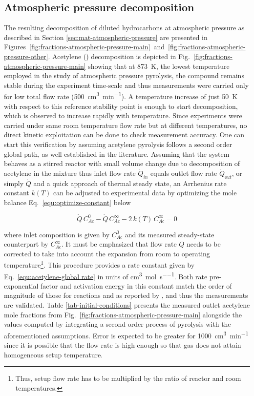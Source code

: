 \documentclass[final,3p,times,twocolumn,sort&compress]{elsarticle}
\newcommand{\sccm}{\cubic\centi\metre\per\minute}
\begin{document}
\subsection{Atmospheric pressure decomposition}

The resulting decomposition of diluted hydrocarbons at atmospheric pressure as described in Section \ref{sec:mat-atmospheric-pressure} are presented in Figures~\ref{fig:fractions-atmospheric-pressure-main}~and~\ref{fig:fractions-atmospheric-pressure-other}.
Acetylene () decomposition is depicted in Fig.~\ref{fig:fractions-atmospheric-pressure-main} showing that at \SI{873}{\kelvin}, the lowest temperature employed in the study of atmospheric pressure pyrolysis, the compound remains stable during the experiment time-scale and thus measurements were carried only for low total flow rate (\SI{500}{\sccm}). A temperature increase of just \SI{50}{\kelvin} with respect to this reference stability point is enough to start decomposition, which is observed to increase rapidly with temperature. Since experiments were carried under same room temperature flow rate but at different temperatures, no direct kinetic exploitation can be done to check measurement accuracy. One can start this verification by assuming acetylene pyrolysis follows a second order global path, as well established in the literature. Assuming that the system behaves as a stirred reactor with small volume change due to decomposition of acetylene in the mixture \textendash{} thus inlet flow rate $\dot{Q}_{in}$ equals outlet flow rate $\dot{Q}_{out}$, or simply $\dot{Q}$ \textendash{} and a quick approach of thermal steady state, an Arrhenius rate constant $k(T)$ can be adjusted to experimental data by optimizing the mole balance Eq.~\ref{equ:optimize-constant} below

\begin{equation}
	\dot{Q}\,C^{0}_{Ac} - \dot{Q}\,C^{\infty}_{Ac}-
	2\,k(T)\,C^{\infty}_{Ac} = 0
	\label{equ:optimize-constant}
\end{equation}

\noindent{}where inlet  composition is given by $C^{0}_{Ac}$ and its measured steady-state counterpart by $C^{\infty}_{Ac}$. It must be emphasized that flow rate $\dot{Q}$ needs to be corrected to take into account the expansion from room to operating temperature\footnote{Thus, setup flow rate has to be multiplied by the ratio of reactor and room temperatures.}. This procedure provides a rate constant given by Eq.~\ref{equ:acetylene-global rate} in units of \si{\cubic\centi\metre\per\mole\per\second}. Both rate pre-exponential factor and activation energy in this constant match the order of magnitude of those for reactions  and  as reported by \citet{Norinaga2009}, and thus the measurements are validated. Table \ref{tab-initial-conditions} presents the measured outlet acetylene mole fractions from Fig.~\ref{fig:fractions-atmospheric-pressure-main} alongside the values computed by integrating a second order process of pyrolysis with the aforementioned assumptions. Error is expected to be greater for \SI{1000}{\sccm} since it is possible that the flow rate is high enough so that gas does not attain homogeneous setup temperature.
\end{document}

